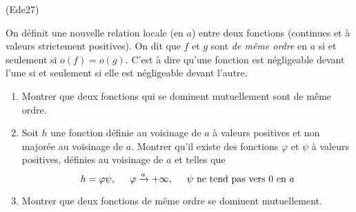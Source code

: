 \begin{tiny}(Ede27)\end{tiny} On définit une nouvelle relation locale (en $a$) entre deux fonctions (continues et à valeurs strictement positives). On dit que $f$ et $g$ sont \emph{de même ordre} en $a$ si et seulement si $o(f)=o(g)$. C'est à dire qu'une fonction est négligeable devant l'une si et seulement si elle est négligeable devant l'autre.
\begin{enumerate}
  \item Montrer que deux fonctions qui se dominent mutuellement sont de même ordre.
  \item Soit $h$ une fonction définie au voisinage de $a$ à valeurs positives et non majorée au voisinage de $a$. Montrer qu'il existe des fonctions $\varphi$ et $\psi$ à valeurs positives, définies au voisinage de $a$ et telles que
\begin{displaymath}
  h = \varphi \psi, \hspace{0.5cm} \varphi \xrightarrow{a} +\infty, \hspace{0.5cm} \psi \text{ ne tend pas vers $0$ en $a$}
\end{displaymath}
\item Montrer que deux fonctions de même ordre se dominent mutuellement.
\end{enumerate}
